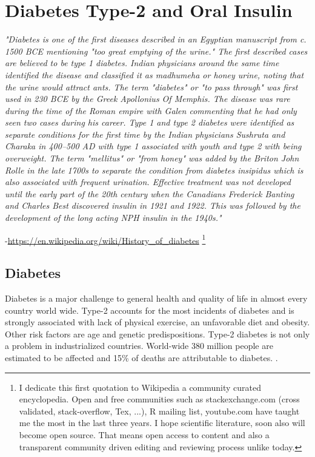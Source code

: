\chapter{Diabetes Type-2 and Oral Insulin}


\textit{"Diabetes is one of the first diseases described in an Egyptian manuscript from c. 1500 BCE mentioning "too great emptying of the urine." The first described cases are believed to be type 1 diabetes. Indian physicians around the same time identified the disease and classified it as madhumeha or honey urine, noting that the urine would attract ants. The term "diabetes" or "to pass through" was first used in 230 BCE by the Greek Apollonius Of Memphis. The disease was rare during the time of the Roman empire with Galen commenting that he had only seen two cases during his career. Type 1 and type 2 diabetes were identified as separate conditions for the first time by the Indian physicians Sushruta and Charaka in 400–500 AD with type 1 associated with youth and type 2 with being overweight. The term "mellitus" or "from honey" was added by the Briton John Rolle in the late 1700s to separate the condition from diabetes insipidus which is also associated with frequent urination. Effective treatment was not developed until the early part of the 20th century when the Canadians Frederick Banting and Charles Best discovered insulin in 1921 and 1922. This was followed by the development of the long acting NPH insulin in the 1940s."}

-\url{https://en.wikipedia.org/wiki/History_of_diabetes} \footnote{I dedicate this first quotation to Wikipedia a community curated encyclopedia. Open and free communities such as stackexchange.com (cross validated, stack-overflow, Tex, ...), R mailing list, youtube.com have taught me the most in the last three years. I hope scientific literature, soon also will become open source. That means open access to content and also a transparent community driven editing and reviewing process unlike today.}
\newpage

\section{Diabetes}
Diabetes is a major challenge to general health and quality of life in almost every country world wide. Type-2 accounts for the most incidents of diabetes and is strongly associated with lack of physical exercise, an unfavorable diet and obesity. Other risk factors are age and genetic predispositions. Type-2 diabetes is not only a problem in industrialized countries.  World-wide 380 million people are estimated to be affected and 15\% of deaths are attributable to diabetes. \cite{aguiree2013idf}.


